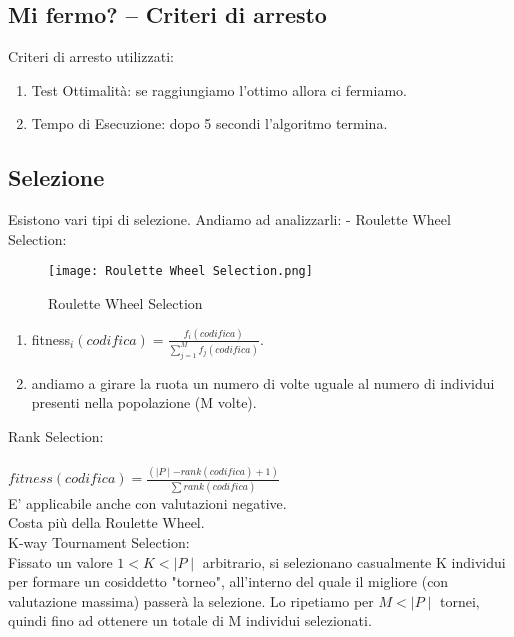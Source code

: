 \documentclass[10pt,a4paper]{article}
\begin{document}
      \newpage
      
    \subsection{Mi fermo? -- Criteri di arresto}
    \label{MiFermo?--CriteriDiArrestoSubsection}
    Criteri di arresto utilizzati:
    \begin{enumerate}
      \item Test Ottimalità: se raggiungiamo l’ottimo allora ci fermiamo.
      \item Tempo di Esecuzione: dopo 5 secondi l’algoritmo termina.
    \end{enumerate}
    
    \subsection{Selezione}
    \label{Selezione}
    Esistono vari tipi di selezione. Andiamo ad analizzarli:
    - Roulette Wheel Selection:
    \begin{figure}[h!]
      \centering
      \caption{Roulette Wheel Selection}
      \texttt{[image: Roulette Wheel Selection.png]}
      \label{RouletteWheelSelection}
    \end{figure}
    \begin{enumerate}
      \item fitness$_{i}(codifica) =\frac{f_{i}(codifica)}{\sum\limits_{j = 1}^{M} {f_{j} (codifica)}}$.
      \item andiamo a girare la ruota un numero di volte uguale al numero di individui presenti nella 
            popolazione (M volte).
    \end{enumerate} 
    
    \newpage
    
    Rank Selection:\\\\
    $ fitness(codifica) = \frac {(\mid P \mid - rank(codifica) + 1)} {\sum{rank(codifica)}}$\\
    E’ applicabile anche con valutazioni negative.\\
    Costa più della Roulette Wheel.\\
    
    K-way Tournament Selection:\\
    Fissato un valore $1 < K < \mid P \mid$ arbitrario, si selezionano casualmente K individui per formare un 
    cosiddetto "torneo", all’interno del quale il migliore (con valutazione massima) passerà la 
    selezione. Lo ripetiamo per $M < \mid P \mid$ tornei, quindi fino ad ottenere un totale di M individui 
    selezionati.\\\\
    
\end{document}
